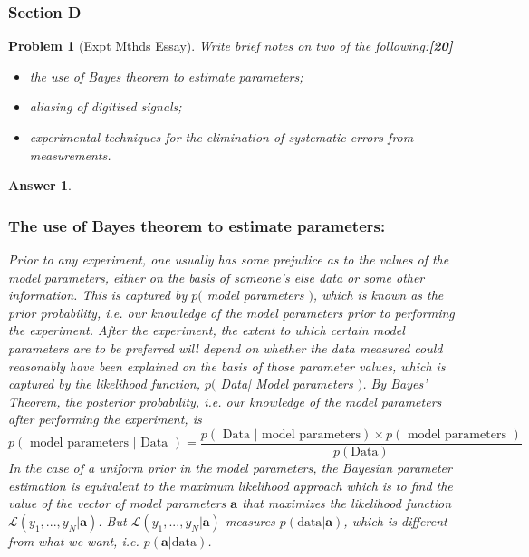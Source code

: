 \documentclass[a4paper]{article}
\newtheorem{ans}{Answer}[subsection]
\theoremstyle{new}
\newtheorem{qns}{Problem}[subsection]
\begin{document}
\subsubsection{Section D}
\begin{qns}[Expt Mthds Essay]
Write brief notes on two of the following:\hfill\textbf{[20]}
\begin{itemize}
    \item the use of Bayes theorem to estimate parameters;
    \item aliasing of digitised signals;
    \item experimental techniques for the elimination of systematic errors from measurements.
\end{itemize}
\end{qns}
\begin{ans}\leavevmode
\subsubsection*{The use of Bayes theorem to estimate parameters:}
Prior to any experiment, one usually has some prejudice as to the values of the model parameters, either on the basis of someone's else data or some other information. This is captured by $p($ model parameters $)$, which is known as the prior probability, i.e. our knowledge of the model parameters prior to performing the experiment. After the experiment, the extent to which certain model parameters are to be preferred will depend on whether the data measured could reasonably have been explained on the basis of those parameter values, which is captured by the likelihood function, $p($ Data| Model parameters $)$. By Bayes' Theorem, the posterior probability, i.e. our knowledge of the model parameters after performing the experiment, is
$$p(\text{ model parameters | Data })=\frac{p(\text{ Data | model parameters})\times p(\text{ model parameters })}{p(\text{Data})}$$
In the case of a uniform prior in the model parameters, the Bayesian parameter estimation is equivalent to the maximum likelihood approach which is to find the value of the vector of model parameters $\mathbf{a}$ that maximizes the likelihood function $\mathcal{L}(y_1,...,y_N|\mathbf{a})$. But $\mathcal{L}(y_1,...,y_N|\mathbf{a})$ measures $p(\text{data}|\mathbf{a})$, which is different from what we want, i.e. $p(\mathbf{a}|\text{data})$. 

\end{ans}
\end{document}
